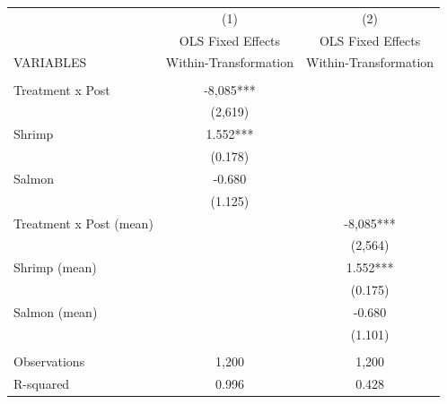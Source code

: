 \begin{tabular}{lcc} \hline
 & (1) & (2) \\
 & OLS Fixed Effects & OLS Fixed Effects \\
VARIABLES & Within-Transformation & Within-Transformation \\ \hline
 &  &  \\
Treatment x Post & -8,085*** &  \\
 & (2,619) &  \\
Shrimp & 1.552*** &  \\
 & (0.178) &  \\
Salmon & -0.680 &  \\
 & (1.125) &  \\
Treatment x Post (mean) &  & -8,085*** \\
 &  & (2,564) \\
Shrimp (mean) &  & 1.552*** \\
 &  & (0.175) \\
Salmon (mean) &  & -0.680 \\
 &  & (1.101) \\
 &  &  \\
Observations & 1,200 & 1,200 \\
 R-squared & 0.996 & 0.428 \\ \hline
\end{tabular}
